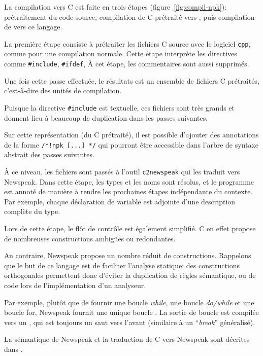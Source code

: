 
La compilation vers C est faite en trois étapes (figure~\ref{fig:compil-npk}):
prétraitement du code source, compilation de C prétraité vers \newspeak{}, puis
compilation de \newspeak{} vers ce langage.

La première étape consiste à prétraiter les fichiers C source avec le logiciel
\texttt{cpp}, comme pour une compilation normale. Cette étape interprète les
directives comme \texttt{\#include}, \texttt{\#ifdef}, À cet étape, les
commentaires sont aussi supprimés.

Une fois cette passe effectuée, le résultats est un ensemble de fichiers C
prétraités, c'est-à-dire des unités de compilation.

Puisque la directive \texttt{\#include} est textuelle, ces fichiers sont très
grands et donnent lieu à beaucoup de duplication dans les passes suivantes.

Sur cette représentation (du C prétraité), il est possible d'ajouter des
annotations de la forme \texttt{/*!npk [...] */} qui pourront être accessible
dans l'arbre de syntaxe abstrait des passes suivantes.

À ce niveau, les fichiers sont passés à l'outil \texttt{c2newspeak} qui les
traduit vers Newspeak. Dans cette étape, les types et les noms sont résolus, et
le programme est annoté de manière à rendre les prochaines étapes indépendante
du contexte. Par exemple, chaque déclaration de variable est adjointe d'une
description complète du type.

Lors de cette étape, le flôt de contrôle est également simplifié. C en effet
propose de nombreuses constructions ambigües ou redondantes.

Au contraire, Newspeak propose un nombre réduit de constructions. Rappelons que
le but de ce langage est de faciliter l'analyse statique: des constructions
orthogonales permettent donc d'éviter la duplication de règles sémantique, ou de
code lors de l'implémentation d'un analyseur.

Par exemple, plutôt que de fournir une boucle \emph{while}, une boucle
\emph{do/while} et une boucle for, Newspeak fournit une unique boucle
\npkWhile{}. La sortie de boucle est compilée vers un \npkGoto{}\cite{goto}, qui
est toujours un saut vers l'avant (similaire à un ``\emph{break}'' généralisé).

La sémantique de Newspeak et la traduction de C vers Newspeak sont décrites dans
\cite{newspeak}.

